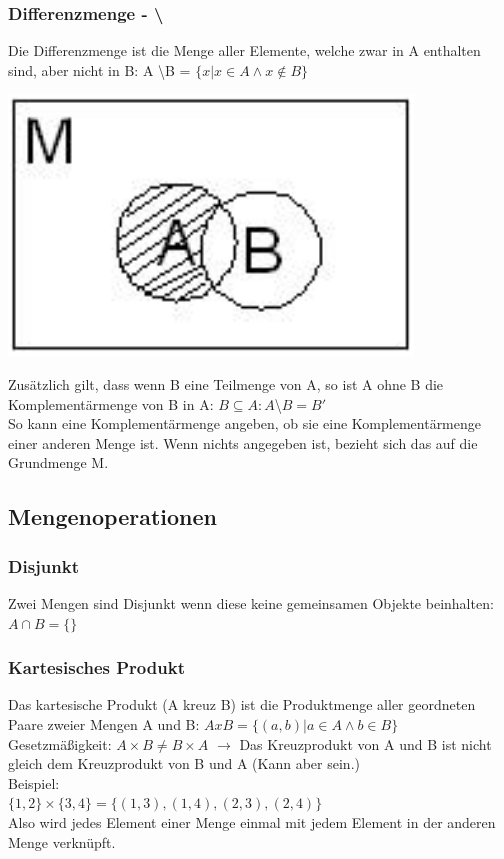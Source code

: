 \documentclass{article}
\begin{document}
	\subsubsection{Differenzmenge - \textbackslash }
	Die Differenzmenge ist die Menge aller Elemente, welche zwar in A enthalten sind, aber nicht in B: A \textbackslash B = $\{x|x \in A \land x \notin B\}$ \\
	\begin{center}
	\includegraphics[scale=0.5]{Bilder/differenz.png} \\
	\end{center}
	Zusätzlich gilt, dass wenn B eine Teilmenge von A, so ist A ohne B die Komplementärmenge von B in A: $B \subseteq A:A $\textbackslash$ B = B'$\\
	So kann eine Komplementärmenge angeben, ob sie eine Komplementärmenge einer anderen Menge ist. Wenn nichts angegeben ist, bezieht sich das auf die Grundmenge M.
	\subsection{Mengenoperationen}
	\subsubsection{Disjunkt}	
	Zwei Mengen sind Disjunkt wenn diese keine gemeinsamen Objekte beinhalten: $A \cap B = \{\}$
	\subsubsection{Kartesisches Produkt}
	Das kartesische Produkt (A kreuz B) ist die Produktmenge aller geordneten Paare zweier Mengen A und B: $A x B = \{(a, b)|a \in A \land b \in B\}$\\
	Gesetzmäßigkeit: $A \times B \neq B \times A$ $\to$ Das Kreuzprodukt von A und B ist nicht gleich dem Kreuzprodukt von B und A (Kann aber sein.) \\
	Beispiel: \\
	$\{1,2\}\times\{3,4\} = \{(1,3),(1,4),(2,3),(2,4)\}$ \\
	Also wird jedes Element einer Menge einmal mit jedem Element in der anderen Menge verknüpft.
\end{document}
